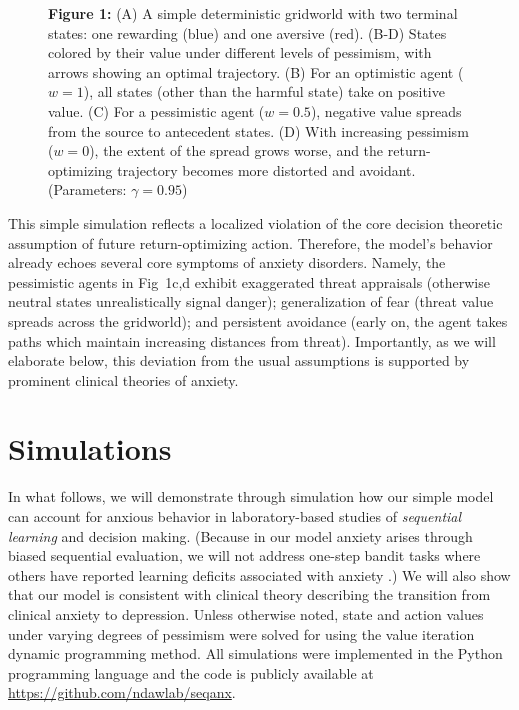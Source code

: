 \documentclass[11pt]{article} %
\begin{document}
\begin{figure}
  \centerline{%
  }
  \par \textbf{Figure 1:} (A) A simple deterministic gridworld with two terminal states: one rewarding (blue) and one aversive (red). (B-D) States colored by their value under different levels of pessimism, with arrows showing an optimal trajectory. (B) For an optimistic agent ($w=1$), all states (other than the harmful state) take on positive value. (C) For a pessimistic agent ($w=0.5$), negative value spreads from the source to antecedent states. (D) With increasing pessimism ($w=0$), the extent of the spread grows worse, and the return-optimizing trajectory becomes more distorted and avoidant. (Parameters: $\gamma = 0.95$)
\end{figure}

This simple simulation reflects a localized violation of the core decision theoretic assumption of future return-optimizing action. Therefore, the model's behavior already echoes several core symptoms of anxiety disorders. Namely, the pessimistic agents in Fig~1c,d exhibit exaggerated threat appraisals (otherwise neutral states unrealistically signal danger); generalization of fear (threat value spreads across the gridworld); and persistent avoidance (early on, the agent takes paths which maintain increasing distances from threat). Importantly, as we will elaborate below, this deviation from the usual assumptions is supported by prominent clinical theories of anxiety.

\section{Simulations}

In what follows, we will demonstrate through simulation how our simple model can account for anxious behavior in laboratory-based studies of \emph{sequential learning}  and decision making. (Because in our model anxiety arises through biased sequential evaluation, we will not address one-step bandit tasks where others have reported learning deficits associated with anxiety \citep{Harle2017, Aylward2019}.) We will also show that our model is consistent with clinical theory describing the transition from clinical anxiety to depression. Unless otherwise noted, state and action values under varying degrees of pessimism were solved for using the value iteration dynamic programming method\citep{SuttonBarto2018}. All simulations were implemented in the Python programming language and the code is publicly available at \url{https://github.com/ndawlab/seqanx}. 
\end{document}
